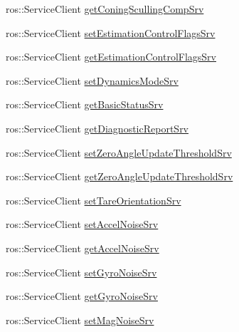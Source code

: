 \begin{DoxyCompactItemize}
ros\+::\+Service\+Client \hyperlink{classmicrostrain__mips__client_1_1ClMicrostainMips_a3958027a0410f29a4c6e0f7376a3665b}{get\+Coning\+Sculling\+Comp\+Srv}
\item 
ros\+::\+Service\+Client \hyperlink{classmicrostrain__mips__client_1_1ClMicrostainMips_a13132b27dff7c8527c42e91dc7dccb39}{set\+Estimation\+Control\+Flags\+Srv}
\item 
ros\+::\+Service\+Client \hyperlink{classmicrostrain__mips__client_1_1ClMicrostainMips_a8f9c894cf9a370cabb071df0c5aaad00}{get\+Estimation\+Control\+Flags\+Srv}
\item 
ros\+::\+Service\+Client \hyperlink{classmicrostrain__mips__client_1_1ClMicrostainMips_a2cf19dcbf3cd63d2ba3624cebb73c912}{set\+Dynamics\+Mode\+Srv}
\item 
ros\+::\+Service\+Client \hyperlink{classmicrostrain__mips__client_1_1ClMicrostainMips_a9d9417b8082c318709d5644895a4f539}{get\+Basic\+Status\+Srv}
\item 
ros\+::\+Service\+Client \hyperlink{classmicrostrain__mips__client_1_1ClMicrostainMips_ad691fdf83a768d37090963580e187f1e}{get\+Diagnostic\+Report\+Srv}
\item 
ros\+::\+Service\+Client \hyperlink{classmicrostrain__mips__client_1_1ClMicrostainMips_aa512e932514eba1022ac4453942dfb68}{set\+Zero\+Angle\+Update\+Threshold\+Srv}
\item 
ros\+::\+Service\+Client \hyperlink{classmicrostrain__mips__client_1_1ClMicrostainMips_ad9cf264fdf8bf949b89a34bbebfa6c69}{get\+Zero\+Angle\+Update\+Threshold\+Srv}
\item 
ros\+::\+Service\+Client \hyperlink{classmicrostrain__mips__client_1_1ClMicrostainMips_abd7ae5a9a62f4a571d05ad07ade23905}{set\+Tare\+Orientation\+Srv}
\item 
ros\+::\+Service\+Client \hyperlink{classmicrostrain__mips__client_1_1ClMicrostainMips_a9131cf72e9303a83abce526c3780b5df}{set\+Accel\+Noise\+Srv}
\item 
ros\+::\+Service\+Client \hyperlink{classmicrostrain__mips__client_1_1ClMicrostainMips_a3c8688daacb1472f90d788e186de6643}{get\+Accel\+Noise\+Srv}
\item 
ros\+::\+Service\+Client \hyperlink{classmicrostrain__mips__client_1_1ClMicrostainMips_a062ecab1da692e2205636e081dc7b107}{set\+Gyro\+Noise\+Srv}
\item 
ros\+::\+Service\+Client \hyperlink{classmicrostrain__mips__client_1_1ClMicrostainMips_a016edb8b282bd20158f0aafc2af0d4e0}{get\+Gyro\+Noise\+Srv}
\item 
ros\+::\+Service\+Client \hyperlink{classmicrostrain__mips__client_1_1ClMicrostainMips_ad8ad28ea6efbdfc37a03067c9efa1836}{set\+Mag\+Noise\+Srv}

\end{DoxyCompactItemize}
